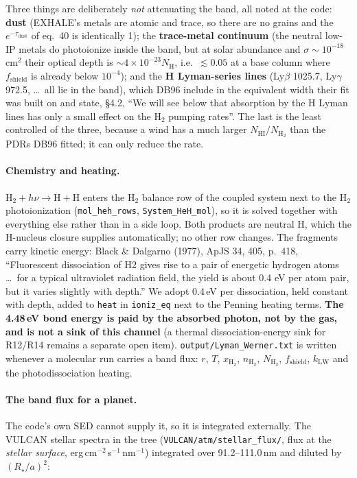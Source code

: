 \documentclass[english,a4paper]{my_memo}
\begin{document}
Three things are deliberately \emph{not} attenuating the band, all noted at the
code: \textbf{dust} (EXHALE's metals are atomic and trace, so there are no grains
and the $e^{-\tau_\mathrm{dust}}$ of eq.~40 is identically 1); the
\textbf{trace-metal continuum} (the neutral low-IP metals do photoionize inside the
band, but at solar abundance and $\sigma\sim10^{-18}$\,cm$^{2}$ their optical depth
is ${\sim}4\times10^{-23}N_\mathrm{H}$, i.e.\ $\lesssim0.05$ at a base column where
$f_\mathrm{shield}$ is already below $10^{-4}$); and the \textbf{H Lyman-series
lines} (Ly$\beta$ 1025.7, Ly$\gamma$ 972.5, \ldots\ all lie in the band), which
DB96 include in the equivalent width their fit was built on and state, \S4.2,
``We will see below that absorption by the H Lyman lines has only a small effect on
the H$_2$ pumping rates''. The last is the least controlled of the three, because a
wind has a much larger $N_\mathrm{HI}/N_\mathrm{H_2}$ than the PDRs DB96 fitted; it
can only reduce the rate.

\paragraph{Chemistry and heating.} $\mathrm{H_2}+h\nu\to\mathrm{H}+\mathrm{H}$
enters the H$_2$ balance row of the coupled system next to the H$_2$
photoionization (\texttt{mol\_heh\_rows}, \texttt{System\_HeH\_mol}), so it is
solved together with everything else rather than in a side loop. Both products are
neutral H, which the H-nucleus closure supplies automatically; no other row
changes. The fragments carry kinetic energy: Black \& Dalgarno (1977), ApJS 34,
405, p.~418, ``Fluorescent dissociation of H2 gives rise to a pair of energetic
hydrogen atoms \ldots\ for a typical ultraviolet radiation field, the yield is
about 0.4 eV per atom pair, but it varies slightly with depth.'' We adopt 0.4\,eV
per dissociation, held constant with depth, added to \texttt{heat} in
\texttt{ioniz\_eq} next to the Penning heating terms. \textbf{The 4.48\,eV bond
energy is paid by the absorbed photon, not by the gas, and is not a sink of this
channel} (a thermal dissociation-energy sink for R12/R14 remains a separate open
item). \texttt{output/Lyman\_Werner.txt} is written whenever a molecular run
carries a band flux: $r$, $T$, $x_\mathrm{H_2}$, $n_\mathrm{H_2}$,
$N_\mathrm{H_2}$, $f_\mathrm{shield}$, $k_\mathrm{LW}$ and the photodissociation
heating.

\paragraph{The band flux for a planet.} The code's own SED cannot supply it, so it
is integrated externally. The VULCAN stellar spectra in the tree
(\texttt{VULCAN/atm/stellar\_flux/}, flux at the \emph{stellar surface},
erg\,cm$^{-2}$\,s$^{-1}$\,nm$^{-1}$) integrated over 91.2--111.0\,nm and diluted by
$(R_\star/a)^{2}$:
\end{document}
